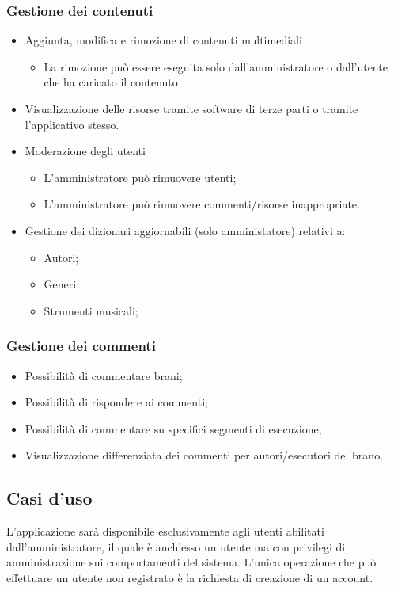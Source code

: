 \documentclass[a4paper]{article}
\begin{document}
\subsubsection{Gestione dei contenuti}
\begin{itemize}
    \item Aggiunta, modifica e rimozione di contenuti multimediali
    \begin{itemize}
        \item La rimozione può essere eseguita solo dall’amministratore o dall’utente che ha caricato il contenuto
    \end{itemize}
    \item Visualizzazione delle risorse tramite software di terze parti o tramite l’applicativo stesso.
    \item Moderazione degli utenti
    \begin{itemize}
        \item L’amministratore può rimuovere utenti;
        \item L’amministratore può rimuovere commenti/risorse inappropriate.
    \end{itemize}
    \item Gestione dei dizionari aggiornabili (solo amministatore) relativi a:
    \begin{itemize}
        \item Autori;
        \item Generi;
        \item Strumenti musicali;
    \end{itemize}
\end{itemize}

\subsubsection{Gestione dei commenti}
\begin{itemize}
    \item Possibilità di commentare brani;
    \item Possibilità di rispondere ai commenti;
    \item Possibilità di commentare su specifici segmenti di esecuzione;
    \item Visualizzazione differenziata dei commenti per autori/esecutori del brano.
\end{itemize}

\subsection{Casi d'uso}
L’applicazione sarà disponibile esclusivamente agli utenti abilitati dall’amministratore, il quale è anch’esso un utente ma con privilegi di amministrazione sui comportamenti del sistema. L’unica operazione che può effettuare un utente non registrato è la richiesta di creazione di un account.
\end{document}
